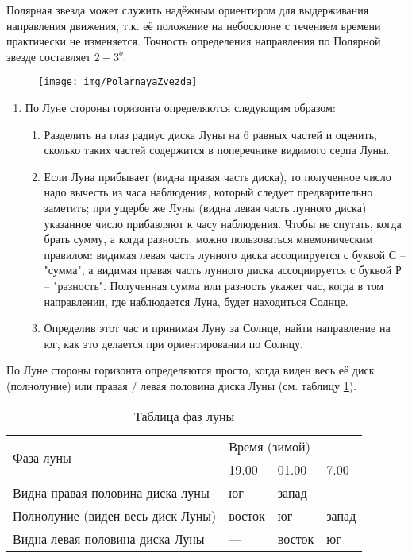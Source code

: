 \documentclass[12pt,a4paper]{report}
\begin{document}
Полярная звезда может служить надёжным ориентиром для выдерживания направления движения, т.к. её положение на небосклоне с течением времени практически не изменяется. Точность определения направления по Полярной звезде составляет $2-3^{o}$.
\begin{figure}[h]
\centering
\texttt{[image: img/PolarnayaZvezda]}
\caption[Определение положения полярной звезды]{}
\label{fig:PolarnayaZvezda}
\end{figure}


\begin{enumerate}
	\item По  Луне стороны горизонта определяются следующим образом:
	\begin{enumerate}
\item  Разделить на глаз радиус диска Луны на 6 равных частей и оценить, сколько таких частей содержится в поперечнике видимого серпа Луны.
\item  Если Луна прибывает (видна правая часть диска), то полученное число надо вычесть из часа наблюдения, который следует предварительно заметить; при ущербе же Луны (видна левая часть лунного диска) указанное число прибавляют к часу наблюдения. Чтобы не спутать, когда брать сумму, а когда разность, можно пользоваться мнемоническим правилом: видимая левая часть лунного диска ассоциируется с буквой С – "сумма", а видимая правая часть лунного диска ассоциируется с буквой Р – "разность".
Полученная сумма или разность укажет час, когда в том направлении, где наблюдается Луна, будет находиться Солнце.
\item  Определив этот час и принимая Луну за Солнце, найти направление на юг, как это делается при ориентировании по Солнцу.
\end{enumerate}
\end{enumerate}
По Луне стороны горизонта определяются просто, когда виден весь её диск (полнолуние) или правая / левая половина диска Луны (см. таблицу \ref{tab:MoonFaz}).
\begin{table}[]
	\centering
	\caption{Таблица фаз луны}
	\label{tab:MoonFaz}
	\begin{tabular}{|l|l|l|l|}
		\hline
		\multirow{2}{*}{Фаза луны}        & \multicolumn{3}{l|}{Время (зимой)} \\ \cline{2-4} 
		& 19.00      & 01.00      & 7.00     \\ \hline
		Видна правая половина диска луны  & юг         & запад      & ---      \\ \hline
		Полнолуние (виден весь диск Луны) & восток     & юг         & запад    \\ \hline
		Видна левая половина диска Луны   & ---        & восток     & юг       \\ \hline
	\end{tabular}
\end{table}
 
\end{document}
